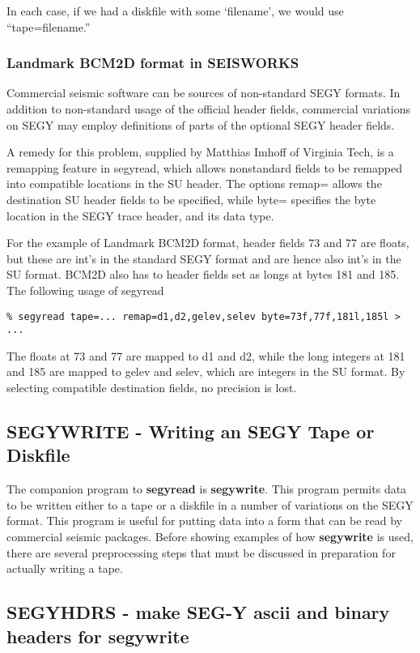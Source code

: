 {{{In each case, if we had a diskfile with some `filename', we would
use ``tape=filename.''

\subsubsection{Landmark BCM2D format in SEISWORKS}

Commercial seismic software can be sources of non-standard SEGY formats.
In addition to non-standard usage of the official header fields, 
commercial variations on SEGY may employ definitions of parts of the 
optional SEGY header fields.

A remedy for this problem, supplied by Matthias Imhoff of Virginia Tech,
is a remapping feature in segyread, which allows nonstandard fields
to be remapped into compatible locations in the SU header.  The
options remap=  allows the destination SU header fields to be specified,
while byte= specifies the byte location in the SEGY trace header, and
its data type.

For the example of Landmark BCM2D format, header fields 73 and 77 are
floats, but these are int's in the standard SEGY format and are hence
also int's in the SU format. BCM2D also has to header fields set as longs
at bytes 181 and 185. The following usage of segyread 

{\small\begin{verbatim}
% segyread tape=... remap=d1,d2,gelev,selev byte=73f,77f,181l,185l > ...
\end{verbatim}}\noindent

The floats at 73 and 77 are mapped to d1 and d2, while the long integers at 
181 and 185 are mapped to gelev and selev, which are integers in the
SU format. By selecting compatible destination fields, no precision
is lost.

\subsection{SEGYWRITE - Writing an SEGY Tape or Diskfile}
The companion program to {\bf segyread\/} is {\bf segywrite}. This program
permits data to be written either to a tape or a diskfile in
a number of variations on the SEGY format.
This program is useful for putting data into a form that can be
read by commercial seismic packages.
Before showing examples of how {\bf segywrite\/} is used, there
are several preprocessing steps that must be discussed in preparation
for actually writing a tape.

\subsection{SEGYHDRS - make SEG-Y ascii and binary headers for segywrite}

}}}
